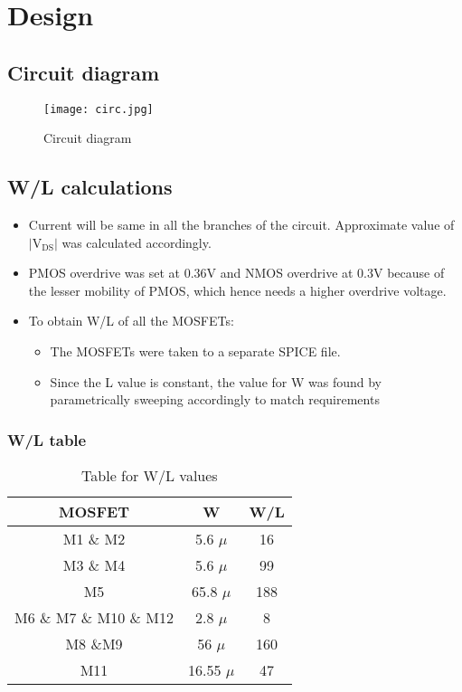 \documentclass[titlepage]{article}
\begin{document}
\section{Design}
\subsection{Circuit diagram}
\begin{figure}[ht]
    \centering
    \texttt{[image: circ.jpg]}
    \caption{Circuit diagram}
    \label{fig:circuit}
\end{figure}
\subsection{W/L calculations}
\begin{itemize}
    \item Current will be same in all the branches of the circuit. Approximate value of $|\text{V}_{\text{DS}}|$ was calculated accordingly.
    \item PMOS overdrive was set at 0.36V and NMOS overdrive at 0.3V because of the lesser mobility of PMOS, which hence needs a higher overdrive voltage.
    \item To obtain W/L of all the MOSFETs:
          \begin{itemize}
              \item  The MOSFETs were taken to a separate SPICE file.
              \item  Since the L value is constant, the value for W was found by parametrically sweeping accordingly to match requirements
          \end{itemize}
\end{itemize}
\subsubsection{W/L table}
\begin{table}[ht]
    \centering
    \begin{tabular}{|c|c|c|}
        \hline
        MOSFET                  & W            & W/L \\
        \hline
        M1 \& M2                & 5.6  $\mu$   & 16  \\
        M3 \& M4                & 5.6  $\mu$   & 99  \\
        M5                      & 65.8 $\mu$   & 188 \\
        M6 \& M7  \& M10 \& M12 & 2.8  $\mu$   & 8   \\
        M8 \&M9                 & 56  $\mu$    & 160 \\
        M11                     & 16.55  $\mu$ & 47  \\
        \hline
    \end{tabular}
    \caption{Table for W/L values}
\end{table}
\newpage
\end{document}
